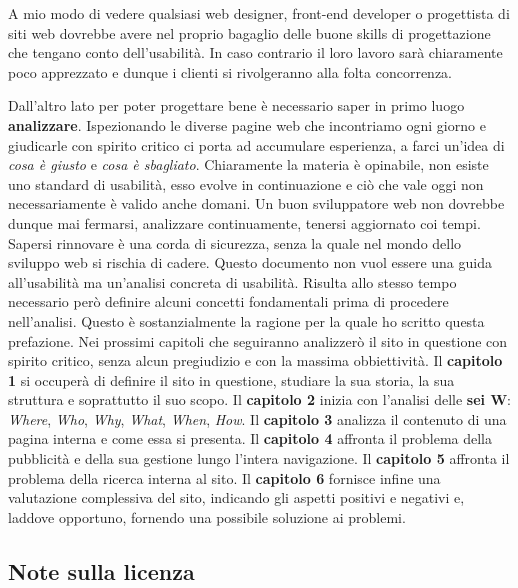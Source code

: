 A mio modo di vedere qualsiasi web designer, front-end developer o progettista di siti web dovrebbe avere nel proprio bagaglio delle buone skills di progettazione che tengano conto dell'usabilità. In caso contrario il loro lavoro sarà chiaramente poco apprezzato e dunque i clienti si rivolgeranno alla folta concorrenza.

Dall'altro lato per poter progettare bene è necessario saper in primo luogo \textbf{analizzare}. Ispezionando le diverse pagine web che incontriamo ogni giorno e giudicarle con spirito critico ci porta ad accumulare esperienza, a farci un'idea di \textit{cosa è giusto} e \textit{cosa è sbagliato}. Chiaramente la materia è opinabile, non esiste uno standard di usabilità, esso evolve in continuazione e ciò che vale oggi non necessariamente è valido anche domani. Un buon sviluppatore web non dovrebbe dunque mai fermarsi, analizzare continuamente, tenersi aggiornato coi tempi. Sapersi rinnovare è una corda di sicurezza, senza la quale nel mondo dello sviluppo web si rischia di cadere.
\linebreak
\linebreak
Questo documento non vuol essere una guida all'usabilità ma un'analisi concreta di usabilità. Risulta allo stesso tempo necessario però definire alcuni concetti fondamentali prima di procedere nell'analisi. Questo è sostanzialmente la ragione per la quale ho scritto questa prefazione. Nei prossimi capitoli che seguiranno analizzerò il sito in questione con spirito critico, senza alcun pregiudizio e con la massima obbiettività. Il \textbf{capitolo 1} si occuperà di definire il sito in questione, studiare la sua storia, la sua struttura e soprattutto il suo scopo. Il \textbf{capitolo 2} inizia con l'analisi delle \textbf{sei W}: \textit{Where}, \textit{Who}, \textit{Why}, \textit{What}, \textit{When}, \textit{How}. Il \textbf{capitolo 3} analizza il contenuto di una pagina interna e come essa si presenta. Il \textbf{capitolo 4} affronta il problema della pubblicità e della sua gestione lungo l'intera navigazione. Il \textbf{capitolo 5} affronta il problema della ricerca interna al sito. Il \textbf{capitolo 6} fornisce infine una valutazione complessiva del sito, indicando gli aspetti positivi e negativi e, laddove opportuno, fornendo una possibile soluzione ai problemi.

\subsection*{Note sulla licenza}

